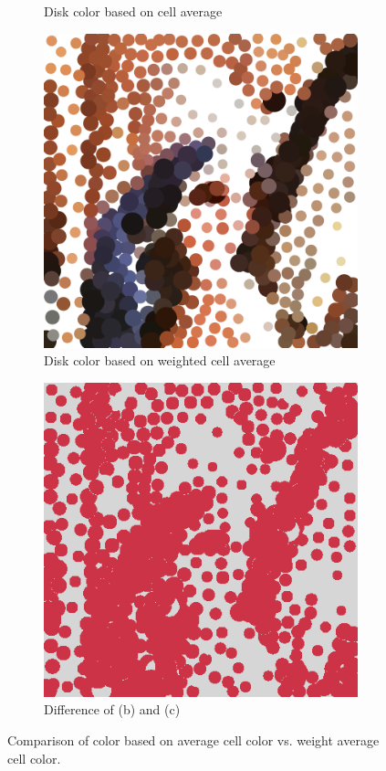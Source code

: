 \documentclass[11pt]{article}
\begin{document}
\begin{figure}[H]
\begin{subfigure}{0.4\textwidth}
 \caption{Disk color based on cell average}
    \end{subfigure}
        \begin{subfigure}{0.4\textwidth}
        \centering
        \includegraphics[width=\textwidth]{../results/hedcuter/A-2.pdf}
 \caption{Disk color based on  weighted cell average}
    \end{subfigure}
    \begin{subfigure}{0.4\textwidth}
        \centering
        \includegraphics[width=\textwidth]{../results/hedcuter/A-3.png}
 \caption{Difference of (b) and (c)}
    \end{subfigure}
    \caption{Comparison of color based on average cell color vs. weight average cell color. }
    \label{fig:color}
\end{figure}
\end{document}
